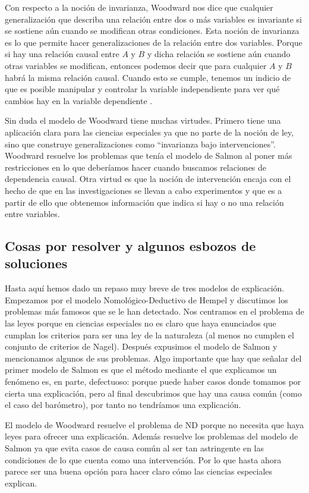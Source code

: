 Con respecto a la noción de invarianza, Woodward nos dice que cualquier generalización que describa una relación entre dos o más variables es invariante si se sostiene aún cuando se modifican otras condiciones. Esta noción de invarianza es lo que permite hacer generalizaciones de la relación entre dos variables. Porque si hay una relación causal entre $A$ y $B$ y dicha relación se sostiene aún cuando otras variables se modifican, entonces podemos decir que para cualquier $A$ y $B$ habrá la misma relación causal. Cuando esto se cumple, tenemos un indicio de que es posible manipular y controlar la variable independiente para ver qué cambios hay en la variable dependiente \cite{Woodward2000}.

Sin duda el modelo de Woodward tiene muchas virtudes. Primero tiene una aplicación clara para las ciencias especiales ya que no parte de la noción de ley, sino que construye generalizaciones como ``invarianza bajo intervenciones''. Woodward resuelve los problemas que tenía el modelo de Salmon al poner más restricciones en lo que deberíamos hacer cuando buscamos relaciones de dependencia causal. Otra virtud es que la noción de intervención encaja con el hecho de que en las investigaciones se llevan a cabo experimentos y que es a partir de ello que obtenemos información que indica si hay o no una relación entre variables.

\subsection{Cosas por resolver y algunos esbozos de soluciones}

\noindent Hasta aquí hemos dado un repaso muy breve de tres modelos de explicación. Empezamos por el modelo Nomológico-Deductivo de Hempel y discutimos los problemas más famosos que se le han detectado. Nos centramos en el problema de las leyes porque en ciencias especiales no es claro que haya enunciados que cumplan los criterios para ser una ley de la naturaleza (al menos no cumplen el conjunto de criterios de Nagel). Después expusimos el modelo de Salmon y mencionamos algunos de sus problemas. Algo importante que hay que señalar del primer modelo de Salmon es que el método mediante el que explicamos un fenómeno es, en parte, defectuoso: porque puede haber casos donde tomamos por cierta una explicación, pero al final descubrimos que hay una causa común (como el caso del barómetro), por tanto no tendríamos una explicación.

El modelo de Woodward resuelve el problema de ND porque no necesita que haya leyes para ofrecer una explicación. Además resuelve los problemas del modelo de Salmon ya que evita casos de causa común al ser tan astringente en las condiciones de lo que cuenta como una intervención. Por lo que hasta ahora parece ser una buena opción para hacer claro cómo las ciencias especiales explican.

